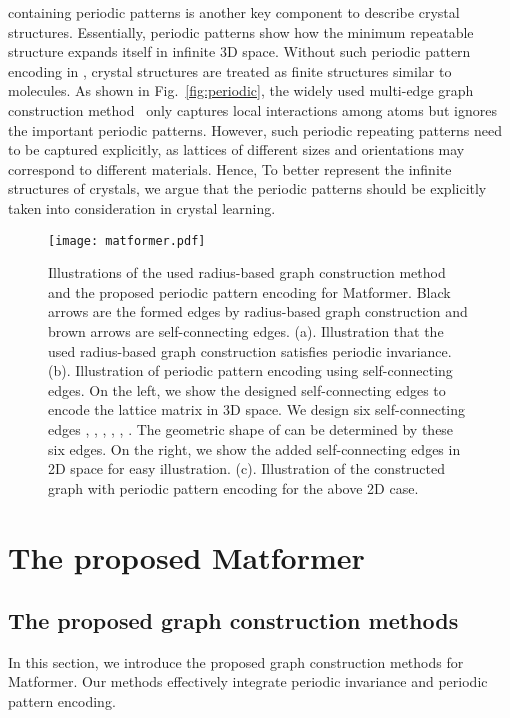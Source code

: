 \documentclass{article}
\begin{document}
containing periodic patterns is another key component to  
describe crystal structures. 
Essentially, periodic patterns show how the minimum repeatable structure  expands itself in infinite 3D space. Without such periodic pattern encoding in , crystal structures are treated as finite structures similar to molecules. 
As shown in Fig.~\ref{fig:periodic}, the widely used multi-edge graph construction method~\citep{cgcnn, megnet, schnet, cyatt, alignn} only captures local interactions among atoms but ignores the important periodic patterns. However, such periodic repeating patterns need to be captured explicitly, as lattices of different sizes and orientations may correspond to different materials. Hence,
To better represent the infinite structures of crystals, we argue that the periodic patterns  should be explicitly taken into consideration in crystal learning.

\begin{figure}
    \centering
    \texttt{[image: matformer.pdf]}
    \vspace{-15 pt}
    \caption{
    Illustrations of the used radius-based graph construction method and the proposed periodic pattern encoding for Matformer. 
Black arrows are the formed edges by radius-based graph construction and brown arrows are self-connecting edges.
    (a). Illustration that the used radius-based graph construction satisfies periodic invariance. 
    (b). Illustration of periodic pattern encoding using self-connecting edges. 
    On the left, we show the designed self-connecting edges to encode the lattice matrix
     in 3D space. 
    We design six self-connecting edges , , , , , . The geometric shape of  can be determined by these six edges. 
    On the right, we show the added self-connecting edges in 2D space for easy illustration. 
(c). Illustration of the constructed graph with periodic pattern encoding for the above 2D case.
    }
    \label{fig:matformer}
    \vspace{-20 pt}
\end{figure}

\section{The proposed Matformer}
\label{sec:4}











\subsection{The proposed graph construction methods} \label{sec:graph}
In this section, we introduce the proposed graph construction methods for Matformer. Our methods effectively integrate periodic invariance and periodic pattern encoding.
\end{document}
